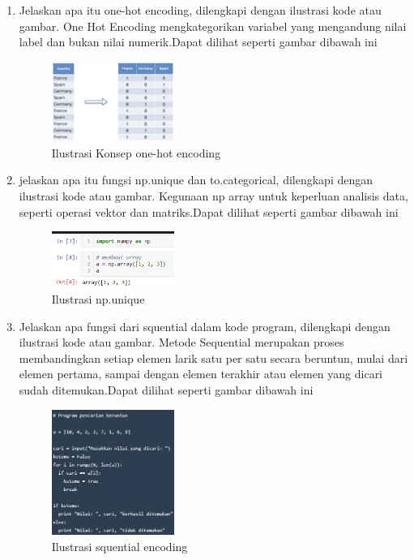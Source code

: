 \begin{enumerate}
        \item Jelaskan apa itu one-hot encoding, dilengkapi dengan ilustrasi kode atau gambar.
        \subitem One Hot Encoding mengkategorikan variabel yang mengandung nilai label dan bukan nilai numerik.Dapat dilihat seperti gambar dibawah ini
        \begin{figure}[H]
            \includegraphics[width=4cm]{figures/1174039/chapter6/teori6.png}
            \centering
            \caption{Ilustrasi Konsep one-hot encoding}
        \end{figure}

        \item jelaskan apa itu fungsi np.unique dan to.categorical, dilengkapi dengan ilustrasi kode atau gambar.
        \subitem Kegunaan np array untuk keperluan analisis data, seperti operasi vektor dan matriks.Dapat dilihat seperti gambar dibawah ini
        \begin{figure}[H]
            \includegraphics[width=4cm]{figures/1174039/chapter6/teori7.png}
            \centering
            \caption{Ilustrasi np.unique}
        \end{figure}

        \item Jelaskan apa fungsi dari squential dalam kode program, dilengkapi dengan ilustrasi kode atau gambar.
        \subitem Metode Sequential merupakan proses membandingkan setiap elemen larik satu per satu secara beruntun, mulai dari elemen pertama, sampai dengan elemen terakhir atau elemen yang dicari sudah ditemukan.Dapat dilihat seperti gambar dibawah ini
        \begin{figure}[H]
            \includegraphics[width=4cm]{figures/1174039/chapter6/teori8.png}
            \centering
            \caption{Ilustrasi squential encoding}
        \end{figure}
    \end{enumerate}
